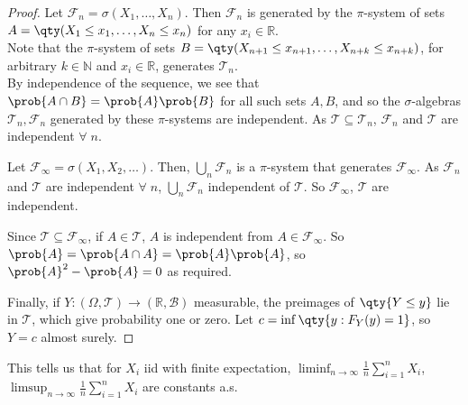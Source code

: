 \begin{proof}
	Let $\mathcal F_n = \sigma(X_1, \dots, X_n)$.
	Then $\mathcal{F}_n$ is generated by the $\pi$-system of sets $A = \qty(X_1 \leq x_1, \dots, X_n \leq x_n)$ for any $x_i \in \mathbb R$. \\
	Note that the $\pi$-system of sets $B = \qty(X_{n+1} \leq x_{n+1}, \dots, X_{n+k} \leq x_{n+k})$, for arbitrary $k \in \mathbb N$ and $x_i \in \mathbb R$, generates $\mathcal T_n$. \\
	By independence of the sequence, we see that $\prob{A \cap B} = \prob{A} \prob{B}$ for all such sets $A, B$, and so the $\sigma$-algebras $\mathcal T_n, \mathcal F_n$ generated by these $\pi$-systems are independent.
	As $\mathcal{T} \subseteq \mathcal{T}_n$, $\mathcal{F}_n$ and $\mathcal{T}$ are independent $\forall \; n$.

	Let $\mathcal F_\infty = \sigma(X_1, X_2, \dots)$.
	Then, $\bigcup_n \mathcal F_n$ is a $\pi$-system that generates $\mathcal F_\infty$.
	As $\mathcal{F}_n$ and $\mathcal{T}$ are independent $\forall \; n$, $\bigcup_n \mathcal F_n$ independent of $\mathcal{T}$.
	So $\mathcal{F}_\infty$, $\mathcal{T}$ are independent.

	Since $\mathcal T \subseteq \mathcal F_\infty$, if $A \in \mathcal T$, $A$ is independent from $A \in \mathcal{F}_\infty$.
	So $\prob{A} = \prob{A \cap A} = \prob{A}\prob{A}$, so $\prob{A}^2 - \prob{A} = 0$ as required.

	Finally, if $Y \colon (\Omega,\mathcal T) \to (\mathbb R,\mathcal B)$ measurable, the preimages of $\qty{Y \leq y}$ lie in $\mathcal T$, which give probability one or zero.
	Let $c = \inf\qty{y : F_Y(y) = 1}$, so $Y = c$ almost surely.
\end{proof}


\begin{remark}
	This tells us that for $X_i$ iid with finite expectation, $\liminf_{n \to \infty} \frac{1}{n} \sum_{i=1}^{n} X_i$, $\limsup_{n \to \infty} \frac{1}{n} \sum_{i=1}^{n} X_i$ are constants a.s.
\end{remark}